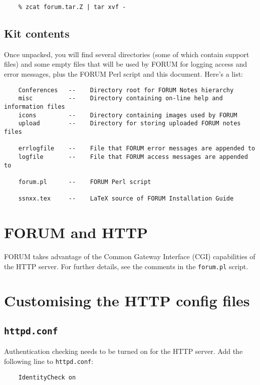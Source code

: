 \documentclass[11pt]{article}
\begin{document}
\begin{verbatim}
    % zcat forum.tar.Z | tar xvf -
\end{verbatim}

\subsection{Kit contents}

Once unpacked, you will find several directories (some of which
contain support files) and some empty files that will be used by FORUM
for logging access and error messages, plus the FORUM Perl script and this
document. Here's a list:

\begin{verbatim}
    Conferences   --    Directory root for FORUM Notes hierarchy
    misc          --    Directory containing on-line help and information files
    icons         --    Directory containing images used by FORUM
    upload        --    Directory for storing uploaded FORUM notes files

    errlogfile    --    File that FORUM error messages are appended to
    logfile       --    File that FORUM access messages are appended to

    forum.pl      --    FORUM Perl script

    ssnxx.tex     --    LaTeX source of FORUM Installation Guide
\end{verbatim}



\section{FORUM and HTTP}

FORUM takes advantage of the Common Gateway Interface (CGI) capabilities of the
HTTP server. For further details, see the comments in the {\tt forum.pl}
script.

\section{Customising the HTTP config files}

\subsection{{\tt httpd.conf}}

Authentication checking needs to be turned on for the HTTP server. Add the
following line to {\tt httpd.conf}:

\begin{verbatim}
    IdentityCheck on
\end{verbatim}
\end{document}
